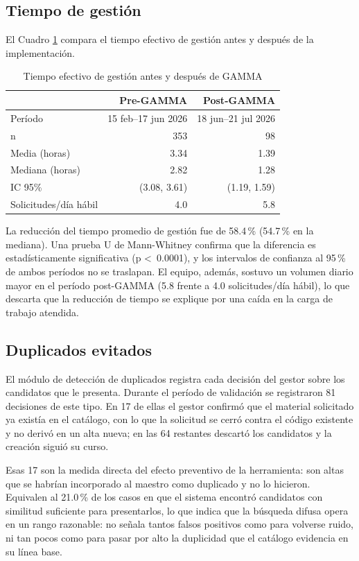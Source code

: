 \subsection{Tiempo de gestión}
El Cuadro \ref{tab:tiempos-post} compara el tiempo efectivo de gestión antes y después de la implementación.

\begin{table}[!htb]
\centering
\caption{Tiempo efectivo de gestión antes y después de GAMMA}
\label{tab:tiempos-post}
\begin{tabular}{lrr}
\toprule
 & \textbf{Pre-GAMMA} & \textbf{Post-GAMMA} \\
\midrule
Período & 15 feb–17 jun 2026 & 18 jun–21 jul 2026 \\
n & 353 & 98 \\
Media (horas) & 3.34 & 1.39 \\
Mediana (horas) & 2.82 & 1.28 \\
IC 95\% & (3.08, 3.61) & (1.19, 1.59) \\
Solicitudes/día hábil & 4.0 & 5.8 \\
\bottomrule
\end{tabular}
\end{table}

La reducción del tiempo promedio de gestión fue de 58.4\,\% (54.7\,\% en la mediana). Una prueba U de Mann-Whitney confirma que la diferencia es estadísticamente significativa (p \textless\ 0.0001), y los intervalos de confianza al 95\,\% de ambos períodos no se traslapan. El equipo, además, sostuvo un volumen diario mayor en el período post-GAMMA (5.8 frente a 4.0 solicitudes/día hábil), lo que descarta que la reducción de tiempo se explique por una caída en la carga de trabajo atendida.



\subsection{Duplicados evitados}

El módulo de detección de duplicados registra cada decisión del gestor sobre los candidatos que le presenta. Durante el período de validación se registraron 81 decisiones de este tipo. En 17 de ellas el gestor confirmó que el material solicitado ya existía en el catálogo, con lo que la solicitud se cerró contra el código existente y no derivó en un alta nueva; en las 64 restantes descartó los candidatos y la creación siguió su curso.

Esas 17 son la medida directa del efecto preventivo de la herramienta: son altas que se habrían incorporado al maestro como duplicado y no lo hicieron. Equivalen al 21.0\,\% de los casos en que el sistema encontró candidatos con similitud suficiente para presentarlos, lo que indica que la búsqueda difusa opera en un rango razonable: no señala tantos falsos positivos como para volverse ruido, ni tan pocos como para pasar por alto la duplicidad que el catálogo evidencia en su línea base.

